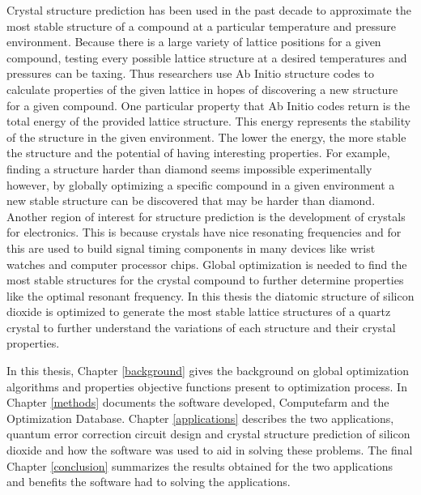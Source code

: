 Crystal structure prediction has been used in the past decade to approximate the most stable structure of a compound at a particular temperature and pressure environment. Because there is a large variety of lattice positions for a given compound, testing every possible lattice structure at a desired temperatures and pressures can be taxing. Thus researchers use Ab Initio structure codes to calculate properties of the given lattice in hopes of discovering a new structure for a given compound. One
particular property that Ab Initio codes return is the total energy of the provided lattice structure. This energy represents the stability of the structure in the given environment. The lower the energy, the more stable the structure and the potential of having interesting properties. For example, finding a structure harder than diamond seems impossible experimentally however, by globally optimizing a specific compound in a given environment a new stable structure can be discovered that may
be harder than diamond. Another region of interest for structure prediction is the development of crystals for electronics. This is because crystals have nice resonating frequencies and for this are used to build signal timing components in many devices like wrist watches and computer processor chips. Global optimization is needed to find the most stable structures for the
crystal compound to further determine properties like the optimal resonant frequency. In this thesis the diatomic structure of silicon dioxide is optimized to generate the most stable lattice structures of a quartz crystal to further understand the variations of each structure and their crystal properties. 

In this thesis, Chapter \ref{background} gives the background on global optimization algorithms and properties objective functions present to optimization process. In Chapter \ref{methods} documents the software developed, Computefarm and the Optimization Database. Chapter \ref{applications} describes the two applications, quantum error correction circuit design and crystal structure prediction of silicon dioxide and how the software was used to aid in
solving these problems. The final Chapter \ref{conclusion} summarizes the results obtained for the two applications and benefits the software had to solving the applications.


